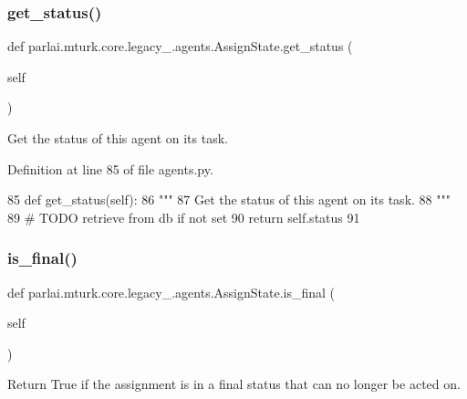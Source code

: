 \subsubsection{\texorpdfstring{get\+\_\+status()}{get\_status()}}
{\footnotesize\ttfamily def parlai.\+mturk.\+core.\+legacy\+\_.\+agents.\+Assign\+State.\+get\+\_\+status (\begin{DoxyParamCaption}\item[{}]{self }\end{DoxyParamCaption})}

\begin{DoxyVerb}Get the status of this agent on its task.
\end{DoxyVerb}
 

Definition at line 85 of file agents.\+py.


\begin{DoxyCode}
85     \textcolor{keyword}{def }get\_status(self):
86         \textcolor{stringliteral}{"""}
87 \textcolor{stringliteral}{        Get the status of this agent on its task.}
88 \textcolor{stringliteral}{        """}
89         \textcolor{comment}{# TODO retrieve from db if not set}
90         \textcolor{keywordflow}{return} self.status
91 
\end{DoxyCode}
\mbox{\label{classparlai_1_1mturk_1_1core_1_1legacy__2018_1_1agents_1_1AssignState_ac1c93e39da15b6daee60058af9d2f04a}} 
\subsubsection{\texorpdfstring{is\+\_\+final()}{is\_final()}}
{\footnotesize\ttfamily def parlai.\+mturk.\+core.\+legacy\+\_.\+agents.\+Assign\+State.\+is\+\_\+final (\begin{DoxyParamCaption}\item[{}]{self }\end{DoxyParamCaption})}

\begin{DoxyVerb}Return True if the assignment is in a final status that can no longer be acted
on.
\end{DoxyVerb}
 

